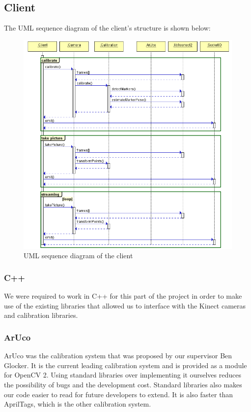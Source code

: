 \documentclass{article}
\begin{document}
\subsection{Client}
The UML sequence diagram of the client's structure is shown below:
\begin{figure}[h]
  \centering
  \includegraphics[scale=0.6]{clientUML}
  \caption{UML sequence diagram of the client}
\end{figure}
\subsubsection{C++}
We were required to work in C++ for this part of the project in order to make use of the existing libraries that allowed us to interface with the Kinect cameras and calibration libraries.
\subsubsection{ArUco}
ArUco was the calibration system that was proposed by our supervisor Ben Glocker. It is the current leading calibration system and is provided as a module for OpenCV 2. Using standard libraries over implementing it ourselves reduces the possibility of bugs and the development cost. Standard libraries also makes our code easier to read for future developers to extend. It is also faster than AprilTags, which is the other calibration system.
\end{document}
